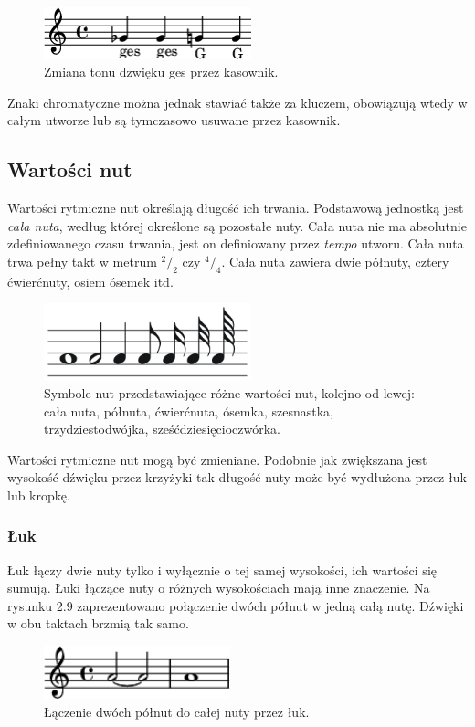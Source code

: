 \documentclass[printmode, eng, openany]{mgr}
\newcommand\tab[1][1cm]{\hspace*{#1}}
\newcommand*\rfrac[2]{{}^{#1}\!/_{#2}}
\begin{document}
\begin{figure}[!htb]
\centering
\includegraphics[width=6cm]{kasownik_poj}
\caption{Zmiana tonu dzwięku ges przez kasownik.}
\end{figure}

\tab Znaki chromatyczne można jednak stawiać także za kluczem, obowiązują wtedy w całym utworze lub są tymczasowo usuwane przez kasownik.

\subsection{Wartości nut}
\tab Wartości rytmiczne nut określają długość ich trwania. Podstawową jednostką jest \textit{cała nuta}, według której określone są pozostałe nuty. Cała nuta nie ma absolutnie zdefiniowanego czasu trwania, jest on definiowany przez \textit{tempo} utworu. Cała nuta trwa pełny takt w metrum $\rfrac{2}{2}$ czy $\rfrac{4}{4}$. Cała nuta zawiera dwie półnuty, cztery ćwierćnuty, osiem ósemek itd. \cite{wart}

\begin{figure}[H]
\centering
\includegraphics[width=6cm]{wartosci_nut}
\caption{Symbole nut przedstawiające różne wartości nut, kolejno od lewej: cała nuta, półnuta, ćwierćnuta, ósemka, szesnastka, trzydziestodwójka, sześćdziesięcioczwórka.}
\end{figure}
\tab Wartości rytmiczne nut mogą być zmieniane. Podobnie jak zwiększana jest wysokość dźwięku przez krzyżyki tak długość nuty może być wydłużona przez łuk lub kropkę. 
\subsubsection{Łuk}
\tab Łuk łączy dwie nuty tylko i wyłącznie o tej samej wysokości, ich wartości się sumują. Łuki łączące nuty o różnych wysokościach mają inne znaczenie. Na rysunku 2.9 zaprezentowano połączenie dwóch półnut w jedną całą nutę. Dźwięki w obu taktach brzmią tak samo.\cite{wart}

\begin{figure}[!htb]
\centering
\includegraphics[width=5.4cm]{luk}
\caption{Łączenie dwóch półnut do całej nuty przez łuk.}
\end{figure}
\end{document}
